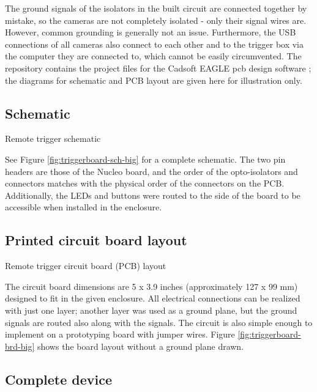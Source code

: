The ground signals of the isolators in the built circuit are connected together by mistake, so the cameras are not completely isolated - only their signal wires are.
However, common grounding is generally not an issue.
Furthermore, the USB connections of all cameras also connect to each other and to the trigger box via the computer they are connected to, which cannot be easily circumvented.
The repository contains the project files for the Cadsoft EAGLE pcb design software \cite{eaglepcb}; the diagrams for schematic and PCB layout are given here for illustration only.

\subsection{Schematic} \label{app:fullschematic}

{Remote trigger schematic}

See Figure \ref{fig:triggerboard-sch-big} for a complete schematic.
The two pin headers are those of the Nucleo board, and the order of the opto-isolators and connectors matches with the physical order of the connectors on the PCB.
Additionally, the LEDs and buttons were routed to the side of the board to be accessible when installed in the enclosure.

\subsection{Printed circuit board layout}

{Remote trigger circuit board (PCB) layout}

The circuit board dimensions are 5 x 3.9 inches (approximately 127 x 99 mm) designed to fit in the given enclosure.
All electrical connections can be realized with just one layer;
another layer was used as a ground plane, but the ground signals are routed also along with the signals.
The circuit is also simple enough to implement on a prototyping board with jumper wires.
Figure \ref{fig:triggerboard-brd-big} shows the board layout without a ground plane drawn.

\subsection{Complete device}

